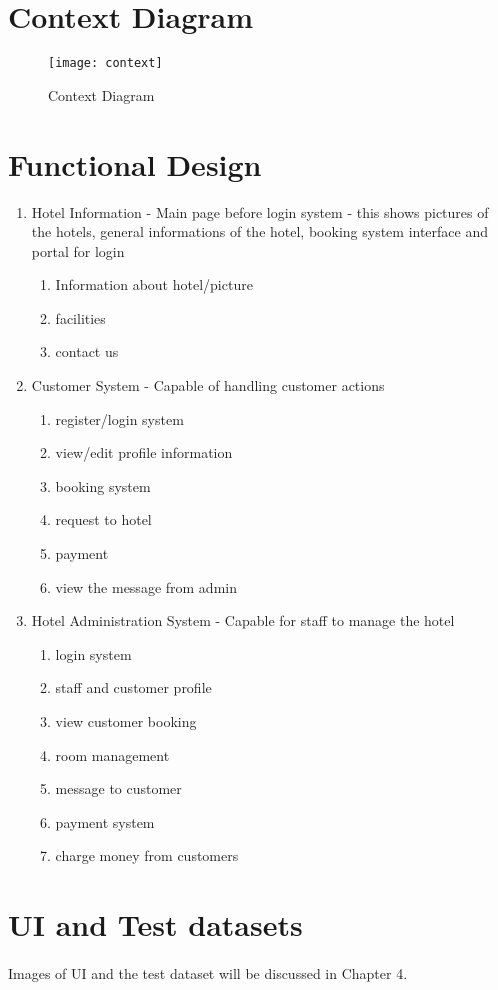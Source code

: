 \newpage
\section{Context Diagram}
\begin{center}

	\begin{figure}[h]
		\texttt{[image: context]}
	\caption{Context Diagram}
	\end{figure}
\end{center}
\newpage
\section{Functional Design}
	\begin{enumerate}
	\item Hotel Information - Main page before login system - this shows pictures of the hotels, general informations of the hotel, booking system interface and portal for login
	\begin{enumerate}
		\item Information about hotel/picture
		\item facilities
		\item contact us
	\end{enumerate}

	\item Customer System - Capable of handling customer actions
	\begin{enumerate}
		\item register/login system
    		\item view/edit profile information
    		\item booking system
    		\item request to hotel
    		\item payment
    		\item view the message from admin
	\end{enumerate}

	\item Hotel Administration System - Capable for staff to manage the hotel
	\begin{enumerate}
	 	\item login system
    		\item staff and customer profile
    		\item view customer booking
 		\item room management
    		\item message to customer
    		\item payment system
		\item charge money from customers
	\end{enumerate}
\end{enumerate}

\section{UI and Test datasets}
	\paragraph{}
		Images of UI and the test dataset will be discussed in Chapter 4.



